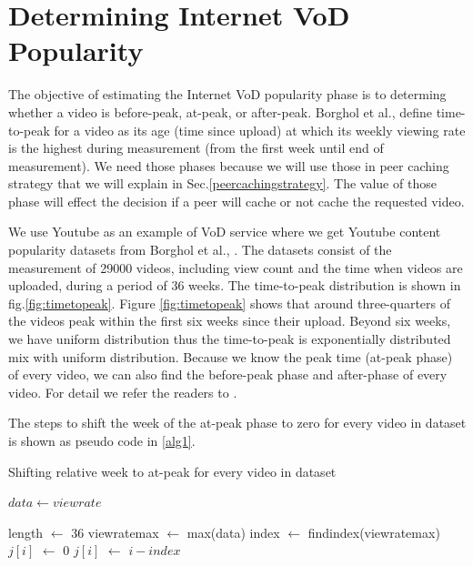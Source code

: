 \documentclass[10pt,final,journal,a4paper]{IEEEtran}
\begin{document}
\section{Determining Internet VoD Popularity}\label{popularity}

The objective of estimating the Internet VoD popularity phase is to determing whether a video is before-peak, at-peak, or  after-peak.
Borghol et al., \cite{Borghol:2011:CMP:2039452.2039717} define time-to-peak for a video as its age (time since upload) at which its weekly viewing rate is the highest during measurement (from the first week until end of measurement).
We need those phases because we will use those in peer caching strategy that we will explain in Sec.\ref{peercachingstrategy}. 
The value of those phase will effect the decision if a peer will cache or not cache the requested video.

We use Youtube as an example of VoD service where we get Youtube content popularity datasets from Borghol et al., \cite{Borghol:2011:CMP:2039452.2039717}.
The datasets consist of the measurement of 29000 videos, including view count and the time when videos are uploaded, during a period of 36 weeks.
The time-to-peak distribution is shown in fig.\ref{fig:timetopeak}.
Figure \ref{fig:timetopeak} shows that around three-quarters of the videos peak within the first six weeks since their upload. 
Beyond six weeks, we have uniform distribution thus the time-to-peak is exponentially distributed mix with uniform distribution. 
Because we know the peak time (at-peak phase) of every video, we can also find the before-peak phase and after-phase of every video. 
For detail we refer the readers to \cite{Borghol:2011:CMP:2039452.2039717}.

The steps to shift the week of the at-peak phase to zero for every video in dataset is shown as pseudo code in \ref{alg1}.

\begin{algorithm}
\caption{Shifting relative week to at-peak for every video in dataset}
\label{alg1}
\begin{algorithmic}
\REQUIRE $data \leftarrow view rate$

\STATE length $\leftarrow$ 36 
\STATE viewratemax $\leftarrow$ max(data) 
\STATE index $\leftarrow$ findindex(viewratemax)
\STATE $j[i]$ $\leftarrow$ $0$ 
\ENDFOR
{}
\STATE $j[i]$ $\leftarrow$ $i-index$ 
\ENDFOR
\ENDFOR
\end{algorithmic}
\end{algorithm}
\end{document}
